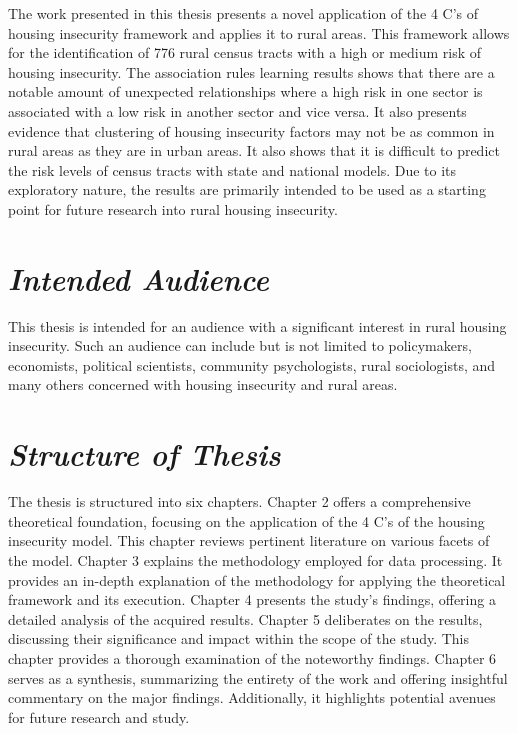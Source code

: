 The work presented in this thesis presents a novel application of the 4 C's of housing insecurity framework and applies it to rural areas. This framework allows for the identification of 776 rural census tracts with a high or medium risk of housing insecurity. The association rules learning results shows that there are a notable amount of unexpected relationships where a high risk in one sector is associated with a low risk in another sector and vice versa. It also presents evidence that clustering of housing insecurity factors may not be as common in rural areas as they are in urban areas. It also shows that it is difficult to predict the risk levels of census tracts with state and national models. Due to its exploratory nature, the results are primarily intended to be used as a starting point for future research into rural housing insecurity. 

\section{\textit{Intended Audience}}
This thesis is intended for an audience with a significant interest in rural housing insecurity. Such an audience can include but is not limited to policymakers, economists, political scientists, community psychologists, rural sociologists, and many others concerned with housing insecurity and rural areas. 

\section{\textit{Structure of Thesis}}
The thesis is structured into six chapters. Chapter 2 offers a comprehensive theoretical foundation, focusing on the application of the 4 C's of the housing insecurity model. This chapter reviews pertinent literature on various facets of the model. Chapter 3 explains the methodology employed for data processing. It provides an in-depth explanation of the methodology for applying the theoretical framework and its execution. Chapter 4 presents the study's findings, offering a detailed analysis of the acquired results. Chapter 5 deliberates on the results, discussing their significance and impact within the scope of the study. This chapter provides a thorough examination of the noteworthy findings. Chapter 6 serves as a synthesis, summarizing the entirety of the work and offering insightful commentary on the major findings. Additionally, it highlights potential avenues for future research and study.

\endinput